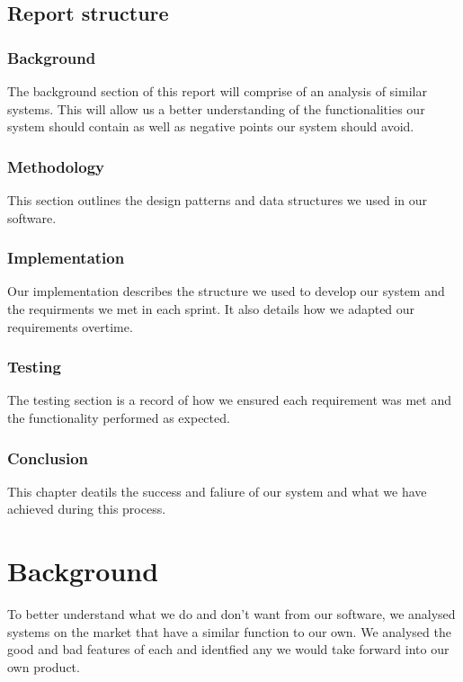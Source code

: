 \documentclass[a4paper, oneside, 11pt]{report}
\begin{document}
\section{Report structure}

\subsection {Background}

The background section of this report will comprise of an analysis of similar systems. This will allow us a better understanding of the functionalities our system should contain as well as negative points our system should avoid.

\subsection {Methodology}

This section outlines the design patterns and data structures we used in our software.

\subsection {Implementation}

Our implementation describes the structure we used to develop our system and the requirments we met in each sprint. It also details how we adapted our requirements overtime.

\subsection {Testing}

The testing section is a record of how we ensured each requirement was met and the functionality performed as expected.

\subsection {Conclusion}

This chapter deatils the success and faliure of our system and what we have achieved during this process.

\chapter{Background}

To better understand what we do and don't want from our software, we analysed systems on the market that have a similar function to our own. We analysed the good and bad features of each and identfied any we would take forward into our own product.
\end{document}
